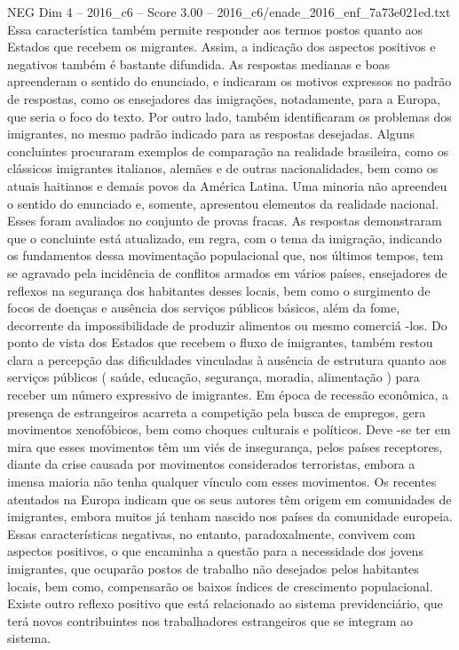 \begin{textsample}{NEG Dim 4 – 2016\_c6 – Score 3.00 – 2016\_c6/enade\_2016\_enf\_7a73e021ed.txt}
Essa característica também permite responder aos termos postos quanto aos Estados que recebem os migrantes.
Assim, a indicação dos aspectos positivos e negativos também é bastante difundida.
As respostas medianas e boas apreenderam o sentido do enunciado, e indicaram os motivos expressos no padrão de respostas, como os ensejadores das imigrações, notadamente, para a Europa, que seria o foco do texto.
Por outro lado, também identificaram os problemas dos imigrantes, no mesmo padrão indicado para as respostas desejadas.
Alguns concluintes procuraram exemplos de comparação na realidade brasileira, como os clássicos imigrantes italianos, alemães e de outras nacionalidades, bem como os atuais haitianos e demais povos da América Latina.
Uma minoria não apreendeu o sentido do enunciado e, somente, apresentou elementos da realidade nacional.
Esses foram avaliados no conjunto de provas fracas.
As respostas demonstraram que o concluinte está atualizado, em regra, com o tema da imigração, indicando os fundamentos dessa movimentação populacional que, nos últimos tempos, tem se agravado pela incidência de conflitos armados em vários países, ensejadores de reflexos na segurança dos habitantes desses locais, bem como o surgimento de focos de doenças e ausência dos serviços públicos básicos, além da fome, decorrente da impossibilidade de produzir alimentos ou mesmo comerciá -los.
Do ponto de vista dos Estados que recebem o fluxo de imigrantes, também restou clara a percepção das dificuldades vinculadas à ausência de estrutura quanto aos serviços públicos ( saúde, educação, segurança, moradia, alimentação ) para receber um número expressivo de imigrantes.
Em época de recessão econômica, a presença de estrangeiros acarreta a competição pela busca de empregos, gera movimentos xenofóbicos, bem como choques culturais e políticos.
Deve -se ter em mira que esses movimentos têm um viés de insegurança, pelos países receptores, diante da crise causada por movimentos considerados terroristas, embora a imensa maioria não tenha qualquer vínculo com esses movimentos.
Os recentes atentados na Europa indicam que os seus autores têm origem em comunidades de imigrantes, embora muitos já tenham nascido nos países da comunidade europeia.
Essas características negativas, no entanto, paradoxalmente, convivem com aspectos positivos, o que encaminha a questão para a necessidade dos jovens imigrantes, que ocuparão postos de trabalho não desejados pelos habitantes locais, bem como, compensarão os baixos índices de crescimento populacional.
Existe outro reflexo positivo que está relacionado ao sistema previdenciário, que terá novos contribuintes nos trabalhadores estrangeiros que se integram ao sistema.

\end{textsample}
